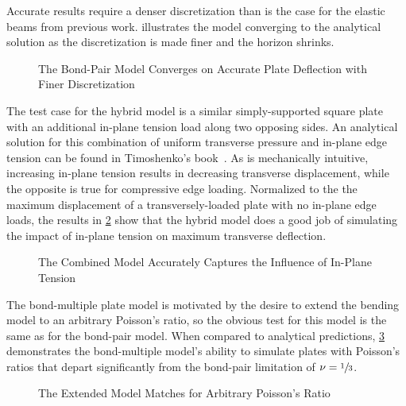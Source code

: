 %
Accurate results require a denser discretization than is the case for the elastic beams from previous work.   illustrates the model converging to the analytical solution as the discretization is made finer and the horizon shrinks.
%
\begin{figure}[tbp]
  \centering
  \resizebox{0.6\linewidth}{!}{}
  \caption{The Bond-Pair Model Converges on Accurate Plate Deflection with Finer Discretization}
  \label{fig:plate_convergence_n}
\end{figure}

The test case for the hybrid model is a similar simply-supported square plate with an additional in-plane tension load along two opposing sides.  An analytical solution for this combination of uniform transverse pressure and in-plane edge tension can be found in Timoshenko's book~\cite{timoshenko1959theory}.  As is mechanically intuitive, increasing in-plane tension results in decreasing transverse displacement, while the opposite is true for compressive edge loading.  Normalized to the the maximum displacement of a transversely-loaded plate with no in-plane edge loads, the results in \cref{fig:plateStiffening} show that the hybrid model does a good job of simulating the impact of in-plane tension on maximum transverse deflection.
%
\begin{figure}[tbhp]
  \centering
  \resizebox{0.6\linewidth}{!}{}
  \caption{The Combined Model Accurately Captures the Influence of In-Plane Tension}
  \label{fig:plateStiffening}
\end{figure}
%
The bond-multiple plate model is motivated by the desire to extend the bending model to an arbitrary Poisson's ratio, so the obvious test for this model is the same as for the bond-pair model. When compared to analytical predictions, \cref{fig:plate_poisson} demonstrates the bond-multiple model's ability to simulate plates with Poisson's ratios that depart significantly from the bond-pair limitation of $\nu = \sfrac{1}{3}$.
%
\begin{figure}[tbhp]
  \centering
  \resizebox{0.6\linewidth}{!}{}
  \caption{The Extended Model Matches for Arbitrary Poisson's Ratio}
  \label{fig:plate_poisson}
\end{figure}
%

